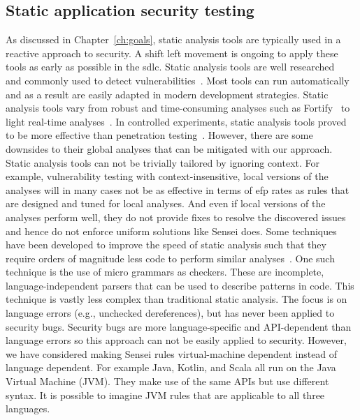 \subsection{Static application security testing}
As discussed in Chapter~\ref{ch:goals}, static analysis tools are typically used in a reactive approach to security.
A shift left movement is ongoing to apply these tools as early as possible in the \gls{sdlc}.
Static analysis tools are well researched~\cite{li2017static,jovanovic2006pixy,livshits2005finding} and commonly used to detect vulnerabilities~\cite{cruzes2017security}.
Most tools can run automatically and as a result are easily adapted in modern development strategies.
Static analysis tools vary from robust and time-consuming analyses such as Fortify~\cite{chess2004static} to light real-time analyses~\cite{brown2016build}.
In controlled experiments, static analysis tools proved to be more effective than penetration testing~\cite{Scandariato2013}.
However, there are some downsides to their global analyses that can be mitigated with our approach.
Static analysis tools can not be trivially tailored by ignoring context.
For example, vulnerability testing with context-insensitive, local versions of the analyses will in many cases not be as effective in terms of \gls{efp} rates as rules that are designed and tuned for local analyses.
And even if local versions of the analyses perform well, they do not provide fixes to resolve the discovered issues and hence do not enforce uniform solutions like Sensei does.
Some techniques have been developed to improve the speed of static analysis such that they require orders of magnitude less code to perform similar analyses~\cite{brown2016build}.
One such technique is the use of micro grammars as checkers.
These are incomplete, language-independent parsers that can be used to describe patterns in code.
This technique is vastly less complex than traditional static analysis.
The focus is on language errors (e.g., unchecked dereferences), but has never been applied to security bugs.
Security bugs are more language-specific and API-dependent than language errors so this approach can not be easily applied to security.
However, we have considered making Sensei rules virtual-machine dependent instead of language dependent.
For example Java, Kotlin, and Scala all run on the Java Virtual Machine (JVM).
They make use of the same APIs but use different syntax.
It is possible to imagine JVM rules that are applicable to all three languages.

